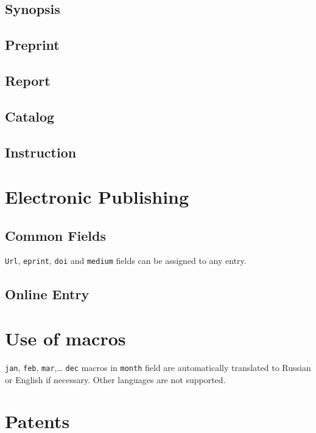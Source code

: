 \documentclass[a4paper]{article}
\begin{document}
\subsection{Synopsis}
\subsection{Preprint}
\subsection{Report}
\subsection{Catalog}
\subsection{Instruction}
\section{Electronic Publishing}
\subsection{Common Fields}
\verb|Url|, \verb|eprint|, \verb|doi| and \verb|medium| fields can be assigned to any entry.
\subsection{Online Entry}
\section{Use of macros}
\texttt{jan}, \texttt{feb}, \texttt{mar},\ldots{} \texttt{dec} macros in \texttt{month} field 
are automatically translated to Russian or English if necessary. Other languages are not supported.
\section{Patents}
\end{document}
